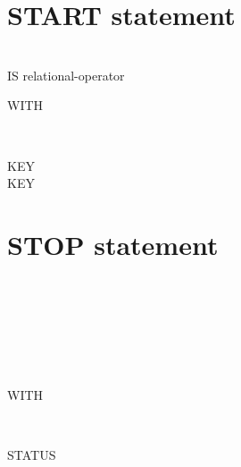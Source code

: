 \section{START statement}

 \filename
\begin{0-1}
   \\

   IS
  relational-operator
  \identifier\\

\end{0-1}

\begin{0-1}
  WITH
  \begin{1=}
     \\
  \end{1=}
  \arithmeticexpression
\end{0-1}

\begin{0+}
   KEY \imperativestatement \\
    KEY \imperativestatement
\end{0+}

\begin{0-1}
\end{0-1}

\section{STOP statement}

\ {}\newline
{} 
\begin{0-1}
  \begin{1=}
     \\
  \end{1=}
  \begin{1=}
    \identifier \\
    \literal
  \end{1=} \\

  WITH
  \begin{1=}
     \\
  \end{1=}
  STATUS
  \begin{0-1}
    \identifier \\
    \literal
  \end{0-1}
\end{0-1}

